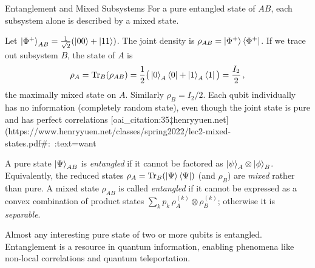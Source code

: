 \begin{frame}{Entanglement and Mixed Subsystems}
  For a pure entangled state of $AB$, each subsystem alone is described by a mixed state. 
  \begin{example}
    Let $\ket{\Phi^+}_{AB} = \frac{1}{\sqrt{2}}(\ket{00} + \ket{11})$. The joint density is $\rho_{AB} = \ket{\Phi^+}\bra{\Phi^+}$. If we trace out subsystem $B$, the state of $A$ is
    \[
      \rho_{A} = \Tr_B(\rho_{AB}) = \frac{1}{2}\big(\ket{0}_A\bra{0} + \ket{1}_A\bra{1}\big) = \frac{I_2}{2}\,,
    \] 
    the maximally mixed state on $A$. Similarly $\rho_B = I_2/2$. Each qubit individually has no information (completely random state), even though the joint state is pure and has perfect correlations [oai_citation:35‡henryyuen.net](https://www.henryyuen.net/classes/spring2022/lec2-mixed-states.pdf#:~:text=want%
  \end{example}
  \begin{definition}[Entanglement]
    A pure state $\ket{\Psi}_{AB}$ is \emph{entangled} if it cannot be factored as $\ket{\psi}_A \otimes \ket{\phi}_B$. Equivalently, the reduced states $\rho_A = \Tr_B(\ket{\Psi}\bra{\Psi})$ (and $\rho_B$) are \textit{mixed} rather than pure. A mixed state $\rho_{AB}$ is called \emph{entangled} if it cannot be expressed as a convex combination of product states $\sum_k p_k\, \rho_A^{(k)} \otimes \rho_B^{(k)}$; otherwise it is \emph{separable}.
  \end{definition}
  Almost any interesting pure state of two or more qubits is entangled. Entanglement is a resource in quantum information, enabling phenomena like non-local correlations and quantum teleportation.
\end{frame}

